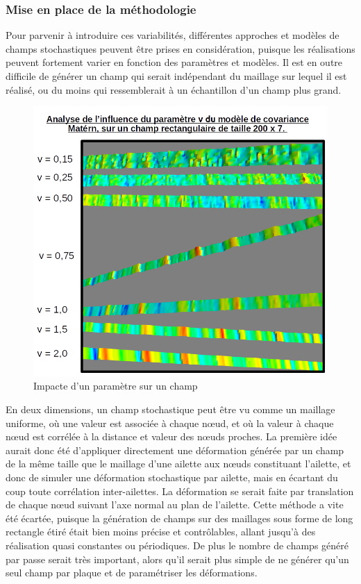 \documentclass[a4paper,10pt]{article}
\begin{document}
\subsubsection{Mise en place de la méthodologie }

Pour parvenir à introduire ces variabilités, différentes approches et modèles de champs stochastiques peuvent être prises en considération, puisque les réalisations peuvent fortement varier en fonction des paramètres et modèles. Il est en outre difficile de générer un champ qui serait indépendant du maillage sur lequel il est réalisé, ou du moins qui ressemblerait à un échantillon d'un champ plus grand. 


\begin{figure}[H]
   \centering   
   \includegraphics[scale=0.3]{maternNu.png}
      \caption{Impacte d'un paramètre sur un champ}
         \label{maternNu}
\end{figure}

En deux dimensions, un champ stochastique peut être vu comme un maillage uniforme, où une valeur est associée à chaque nœud, et où la valeur à chaque nœud est corrélée à la distance et valeur des nœuds proches. La première idée aurait donc été d'appliquer directement une déformation générée par un champ de la même taille que le maillage d'une ailette aux nœuds constituant l'ailette, et donc de simuler une déformation stochastique par ailette, mais en écartant du coup toute corrélation inter-ailettes.
La déformation se serait faite par translation de chaque nœud suivant l'axe normal au plan de l'ailette.
Cette méthode a vite été écartée, puisque la génération de champs sur des maillages sous forme de long rectangle étiré était bien moins précise et contrôlables, allant jusqu'à des réalisation quasi constantes ou périodiques. De plus le nombre de champs généré par passe serait très important, alors qu'il serait plus simple de ne  générer qu'un seul champ par plaque et de paramétriser les déformations.\\
\end{document}
